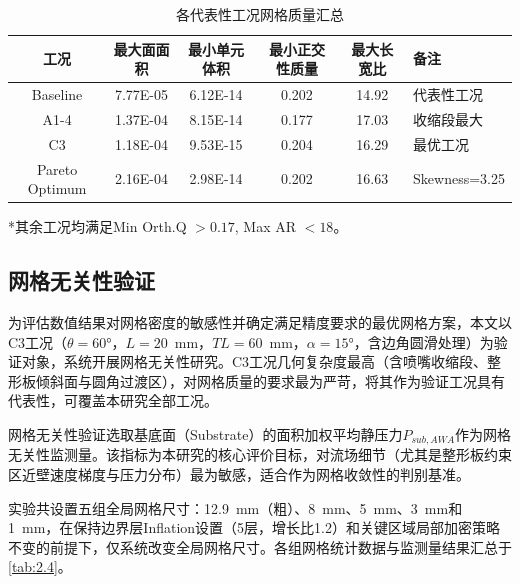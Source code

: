 \begin{table}[!htb]
  \centering
  \caption{各代表性工况网格质量汇总}\label{tab:2.3}
  \renewcommand{\arraystretch}{1.3}
  \begin{tabular}{cccccp{2.5cm}}
    \toprule
    \textbf{工况} & \textbf{最大面面积} & \textbf{最小单元体积} & \textbf{最小正交性质量} & \textbf{最大长宽比} & \textbf{备注} \\
    \midrule
    Baseline       & 7.77E-05 & 6.12E-14 & 0.202 & 14.92 & 代表性工况 \\
    A1-4           & 1.37E-04 & 8.15E-14 & 0.177 & 17.03 & 收缩段最大 \\
    C3             & 1.18E-04 & 9.53E-15 & 0.204 & 16.29 & 最优工况 \\
    Pareto Optimum & 2.16E-04 & 2.98E-14 & 0.202 & 16.63 & Skewness=3.25 \\
    \bottomrule
  \end{tabular}
  \vspace{0.5em}
  
  \footnotesize{*其余工况均满足Min Orth.Q $>0.17$, Max AR $<18$。}
\end{table}

\subsection{网格无关性验证}

为评估数值结果对网格密度的敏感性并确定满足精度要求的最优网格方案，本文以C3工况（$\theta = 60°$，$L = 20$~mm，$TL = 60$~mm，$\alpha = 15°$，含边角圆滑处理）为验证对象，系统开展网格无关性研究。C3工况几何复杂度最高（含喷嘴收缩段、整形板倾斜面与圆角过渡区），对网格质量的要求最为严苛，将其作为验证工况具有代表性，可覆盖本研究全部工况。

网格无关性验证选取基底面（Substrate）的面积加权平均静压力$P_{sub,AWA}$作为网格无关性监测量。该指标为本研究的核心评价目标，对流场细节（尤其是整形板约束区近壁速度梯度与压力分布）最为敏感，适合作为网格收敛性的判别基准。

实验共设置五组全局网格尺寸：12.9~mm（粗）、8~mm、5~mm、3~mm和1~mm，在保持边界层Inflation设置（5层，增长比1.2）和关键区域局部加密策略不变的前提下，仅系统改变全局网格尺寸。各组网格统计数据与监测量结果汇总于\cref{tab:2.4}。

